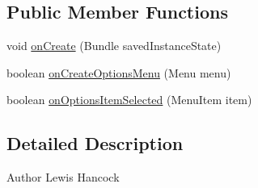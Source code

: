 \subsection*{Public Member Functions}
\begin{DoxyCompactItemize}
\item 
void \hyperlink{classuk_1_1ac_1_1swan_1_1digitaltrails_1_1accounts_1_1_quick_prefs_activity_a8886739613edbdab83feb02c8327b4e1}{on\+Create} (Bundle saved\+Instance\+State)
\item 
boolean \hyperlink{classuk_1_1ac_1_1swan_1_1digitaltrails_1_1accounts_1_1_quick_prefs_activity_ab0fe7e8a2d22dca1aeeaea23e67ee7fe}{on\+Create\+Options\+Menu} (Menu menu)
\item 
boolean \hyperlink{classuk_1_1ac_1_1swan_1_1digitaltrails_1_1accounts_1_1_quick_prefs_activity_aca49facbc4798470ec3232802b088eb5}{on\+Options\+Item\+Selected} (Menu\+Item item)
\end{DoxyCompactItemize}


\subsection{Detailed Description}
\begin{DoxyAuthor}{Author}
Lewis Hancock 
\end{DoxyAuthor}


